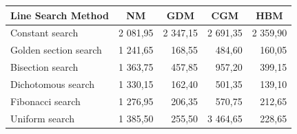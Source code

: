 \documentclass[english, 12pt, a4paper, sci, utf8, a-1b, online, table]{aaltothesis}
\begin{document}
\begin{table}[H]
    \centering
    \label{tab:colors_avg_overall_mm}
    \begin{tabular}{|l|r|r|r|r|}
    \hline
    \rowcolor[HTML]{C0C0C0} 
    \textbf{Line Search Method} & \multicolumn{1}{c|}{\cellcolor[HTML]{C0C0C0}\textbf{NM}} & \multicolumn{1}{c|}{\cellcolor[HTML]{C0C0C0}\textbf{GDM}} & \multicolumn{1}{c|}{\cellcolor[HTML]{C0C0C0}\textbf{CGM}} & \multicolumn{1}{c|}{\cellcolor[HTML]{C0C0C0}\textbf{HBM}} \\ \hline
    Constant search              & \cellcolor[HTML]{E67B73}2 081,95                         & \cellcolor[HTML]{E67B73}2 347,15                          & \cellcolor[HTML]{EDA19C}2 691,35                          & \cellcolor[HTML]{E67B73}2 359,90                          \\ \hline
    Golden section search         & \cellcolor[HTML]{57BB89}1 241,65                         & \cellcolor[HTML]{91D2B2}168,55                            & \cellcolor[HTML]{91D2B2}484,60                            & \cellcolor[HTML]{91D2B2}160,05                            \\ \hline
    Bisection search             & 1 363,75                                                 & 457,85                                                    & 957,20                                                    & 399,15                                                    \\ \hline
    Dichotomous search           & \cellcolor[HTML]{D2ECDF}1 330,15                         & \cellcolor[HTML]{91D2B2}162,40                            & \cellcolor[HTML]{91D2B2}501,35                            & \cellcolor[HTML]{57BB89}139,10                            \\ \hline
    Fibonacci search             & \cellcolor[HTML]{91D2B2}1 276,95                         & \cellcolor[HTML]{D2ECDF}206,35                            & \cellcolor[HTML]{91D2B2}570,75                            & 212,65                                                    \\ \hline
    Uniform search               & 1 385,50                                                 & 255,50                                                    & \cellcolor[HTML]{E67B73}3 464,65                          & 228,65                                                    \\ \hline

\end{tabular}
\end{table}
\end{document}
